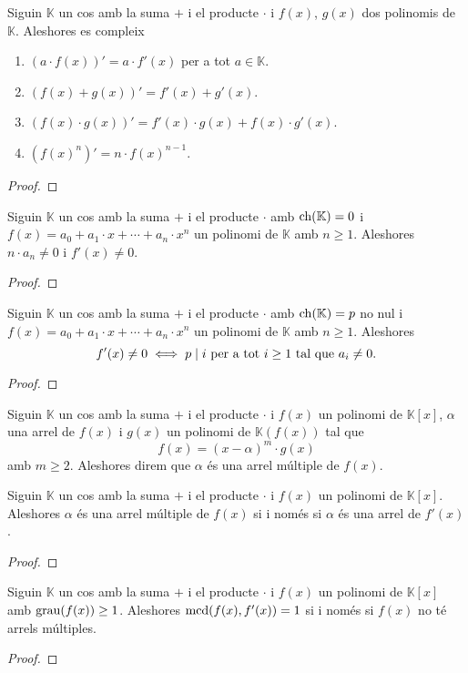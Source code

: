 \documentclass[../Apunts.tex]{subfiles}
\begin{document}
	\begin{proposition}
		Siguin \(\mathbb{K}\) un cos amb la suma \(+\) i el producte \(\cdot\) i \(f(x)\), \(g(x)\) dos polinomis de \(\mathbb{K}\). Aleshores es compleix
		\begin{enumerate}
			\item \((a\cdot f(x))'=a\cdot f'(x)\) per a tot \(a\in\mathbb{K}\).
			\item \((f(x)+g(x))'=f'(x)+g'(x)\).
			\item \((f(x)\cdot g(x))'=f'(x)\cdot g(x)+f(x)\cdot g'(x)\).
			\item \({(f(x)^{n})}'=n\cdot f(x)^{n-1}\).
		\end{enumerate}
		\begin{proof}
		\end{proof}
	\end{proposition}
	\begin{proposition}
		Siguin \(\mathbb{K}\) un cos amb la suma \(+\) i el producte \(\cdot\) amb \(\operatorname{ch}(\mathbb{K})=0\) i \(f(x)=a_{0}+a_{1}\cdot x+\cdots+a_{n}\cdot x^{n}\) un polinomi de \(\mathbb{K}\) amb \(n\geq1\). Aleshores \(n\cdot a_{n}\neq0\) i \(f'(x)\neq0\).
		\begin{proof}
		\end{proof}
	\end{proposition}
	\begin{proposition}
		Siguin \(\mathbb{K}\) un cos amb la suma \(+\) i el producte \(\cdot\) amb \(\operatorname{ch}(\mathbb{K})=p\) no nul i \(f(x)=a_{0}+a_{1}\cdot x+\cdots+a_{n}\cdot x^{n}\) un polinomi de \(\mathbb{K}\) amb \(n\geq1\). Aleshores
		\[f'(x)\neq0\iff p\mathrel{|} i\text{ per a tot }i\geq1\text{ tal que }a_{i}\neq0.\]
		\begin{proof}
		\end{proof}
	\end{proposition}
	\begin{definition}
		\label{def:arrel múltiple}
		Siguin \(\mathbb{K}\) un cos amb la suma \(+\) i el producte \(\cdot\) i \(f(x)\) un polinomi de \(\mathbb{K}[x]\), \(\alpha\) una arrel de \(f(x)\) i \(g(x)\) un polinomi de \(\mathbb{K}(f(x))\) tal que 
		\[f(x)=(x-\alpha)^{m}\cdot g(x)\]
		amb \(m\geq2\). Aleshores direm que \(\alpha\) és una arrel múltiple de \(f(x)\).
	\end{definition}
	\begin{proposition}
		Siguin \(\mathbb{K}\) un cos amb la suma \(+\) i el producte \(\cdot\) i \(f(x)\) un polinomi de \(\mathbb{K}[x]\). Aleshores \(\alpha\) és una arrel múltiple de \(f(x)\) si i només si \(\alpha\) és una arrel de \(f'(x)\).
		\begin{proof}
		\end{proof}
	\end{proposition}
	\begin{corollary}
		Siguin \(\mathbb{K}\) un cos amb la suma \(+\) i el producte \(\cdot\) i \(f(x)\) un polinomi de \(\mathbb{K}[x]\) amb \(\operatorname{grau}(f(x))\geq1\). Aleshores \(\operatorname{mcd}(f(x),f'(x))=1\) si i només si \(f(x)\) no té arrels múltiples.
		\begin{proof}
		\end{proof}
	\end{corollary}
\end{document}

